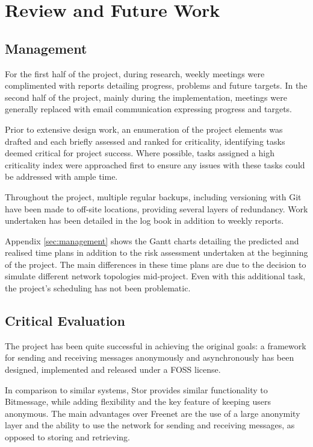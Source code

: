 \section{Review and Future Work}

	\subsection{Management}
		For the first half of the project, during research, weekly meetings were complimented with reports detailing progress, problems and future targets. In the second half of the project, mainly during the implementation, meetings were generally replaced with email communication expressing progress and targets.
		
		Prior to extensive design work, an enumeration of the project elements was drafted and each briefly assessed and ranked for criticality, identifying tasks deemed critical for project success. Where possible, tasks assigned a high criticality index were approached first to ensure any issues with these tasks could be addressed with ample time.
		
		Throughout the project, multiple regular backups, including versioning with Git have been made to off-site locations, providing several layers of redundancy. Work undertaken has been detailed in the log book in addition to weekly reports.

		Appendix \ref{sec:management} shows the Gantt charts detailing the predicted and realised time plans in addition to the risk assessment undertaken at the beginning of the project. The main differences in these time plans are due to the decision to simulate different network topologies mid-project. Even with this additional task, the project's scheduling has not been problematic.
	\subsection{Critical Evaluation}
		The project has been quite successful in achieving the original goals: a framework for sending and receiving messages anonymously and asynchronously has been designed, implemented and released under a FOSS license. 
		
		In comparison to similar systems, Stor provides similar functionality to Bitmessage, while adding flexibility and the key feature of keeping users anonymous. The main advantages over Freenet are the use of a large anonymity layer and the ability to use the network for sending and receiving messages, as opposed to storing and retrieving.
		
